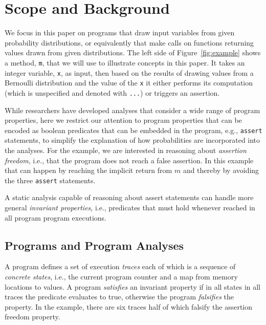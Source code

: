 \section{Scope and Background}
\label{sec:background}



We focus in this paper on programs that draw input variables
from given probability distributions, or equivalently that make
calls on functions returning values drawn from given distributions.
The left side of Figure~\ref{fig:example} shows a method,
\texttt{m}, that we will use to illustrate concepts in this paper.     
It takes an integer variable, \texttt{x}, as input, then based on the 
results of drawing values from a Bernoulli distribution
and the value of the \texttt{x} it either performs its computation
(which is unspecified and denoted with \texttt{...}) or triggers
an assertion. 

While researchers have developed analyses that consider a wide
range of program properties, here
we restrict our attention to program
properties that can be encoded as boolean predicates that
can be embedded in the program,
e.g., \texttt{assert} statements, to simplify the explanation
of how probabilities are incorporated into the analyses.
For the example, we are interested in reasoning about
\textit{assertion freedom}, i.e., that the program does
not reach a false assertion.
In this example
that can happen by reaching the implicit return from $m$
and thereby by avoiding the three \texttt{assert} statements.

A static analysis capable of reasoning about assert statements 
can handle more general \textit{invariant properties}, i.e., 
predicates that must hold whenever reached in all program program executions.  

\subsection{Programs and Program Analyses}
A program defines a set of execution \textit{traces} each of
which is a sequence of \textit{concrete states}, i.e., 
the current program counter and a map from memory locations to values.
A program \textit{satisfies} an invariant property if in all states in
all traces the predicate evaluates to true, otherwise the program
\textit{falsifies} the property.
In the example, there are six traces half of which falsify the assertion
freedom property.

